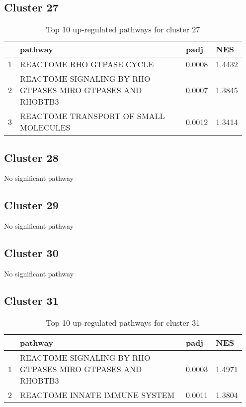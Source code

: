 \documentclass{article}
\begin{document}
\subsection{Cluster 27 }
\begin{table}[H]
\centering
\begin{tabular}{p{0.05\linewidth}p{0.7\linewidth}p{0.1\linewidth}p{0.1\linewidth}}
  \hline
 & pathway & padj & NES \\ 
  \hline
1 & REACTOME RHO GTPASE CYCLE & 0.0008 & 1.4432 \\ 
  2 & REACTOME SIGNALING BY RHO GTPASES MIRO GTPASES AND RHOBTB3 & 0.0007 & 1.3845 \\ 
  3 & REACTOME TRANSPORT OF SMALL MOLECULES & 0.0012 & 1.3414 \\ 
   \hline
\end{tabular}
\caption{Top 10 up-regulated pathways for cluster 27} 
\label{tab:q3_2_27}
\end{table}
\subsection{Cluster 28 }
No significant pathway
\subsection{Cluster 29 }
No significant pathway
\subsection{Cluster 30 }
No significant pathway
\subsection{Cluster 31 }
\begin{table}[H]
\centering
\begin{tabular}{p{0.05\linewidth}p{0.7\linewidth}p{0.1\linewidth}p{0.1\linewidth}}
  \hline
 & pathway & padj & NES \\ 
  \hline
1 & REACTOME SIGNALING BY RHO GTPASES MIRO GTPASES AND RHOBTB3 & 0.0003 & 1.4971 \\ 
  2 & REACTOME INNATE IMMUNE SYSTEM & 0.0011 & 1.3804 \\ 
   \hline
\end{tabular}
\caption{Top 10 up-regulated pathways for cluster 31} 
\label{tab:q3_2_31}
\end{table}
\end{document}

